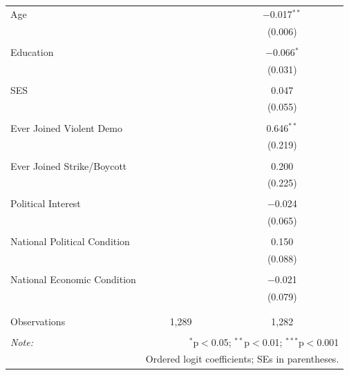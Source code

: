 \begin{table}[!htbp]
\begin{tabular}{@{\extracolsep{5pt}}lcc}
 Age &  & $-$0.017$^{**}$ \\ 
  &  & (0.006) \\ 
  & & \\ 
 Education &  & $-$0.066$^{*}$ \\ 
  &  & (0.031) \\ 
  & & \\ 
 SES &  & 0.047 \\ 
  &  & (0.055) \\ 
  & & \\ 
 Ever Joined Violent Demo &  & 0.646$^{**}$ \\ 
  &  & (0.219) \\ 
  & & \\ 
 Ever Joined Strike/Boycott &  & 0.200 \\ 
  &  & (0.225) \\ 
  & & \\ 
 Political Interest &  & $-$0.024 \\ 
  &  & (0.065) \\ 
  & & \\ 
 National Political Condition &  & 0.150 \\ 
  &  & (0.088) \\ 
  & & \\ 
 National Economic Condition &  & $-$0.021 \\ 
  &  & (0.079) \\ 
  & & \\ 
\hline \\[-1.8ex] 
Observations & 1,289 & 1,282 \\ 
\hline 
\hline \\[-1.8ex] 
\textit{Note:}  & \multicolumn{2}{r}{$^{*}$p$<$0.05; $^{**}$p$<$0.01; $^{***}$p$<$0.001} \\ 
 & \multicolumn{2}{r}{Ordered logit coefficients; SEs in parentheses.} \\ 
\end{tabular} 
\end{table} 
